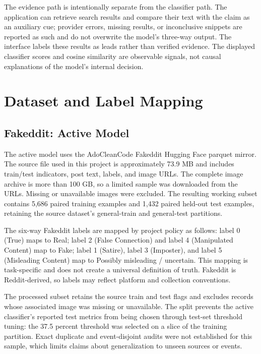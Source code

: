 \documentclass[conference]{IEEEtran}
\begin{document}
The evidence path is intentionally separate from the classifier path. The application can retrieve search results and compare their text with the claim as an auxiliary cue; provider errors, missing results, or inconclusive snippets are reported as such and do not overwrite the model's three-way output. The interface labels these results as leads rather than verified evidence. The displayed classifier scores and cosine similarity are observable signals, not causal explanations of the model's internal decision.

\section{Dataset and Label Mapping}
\subsection{Fakeddit: Active Model}
The active model uses the AdoCleanCode Fakeddit Hugging Face parquet mirror. The source file used in this project is approximately 73.9 MB and includes train/test indicators, post text, labels, and image URLs. The complete image archive is more than 100 GB, so a limited sample was downloaded from the URLs. Missing or unavailable images were excluded. The resulting working subset contains 5,686 paired training examples and 1,432 paired held-out test examples, retaining the source dataset's general-train and general-test partitions.

The six-way Fakeddit labels are mapped by project policy as follows: label 0 (True) maps to Real; label 2 (False Connection) and label 4 (Manipulated Content) map to Fake; label 1 (Satire), label 3 (Imposter), and label 5 (Misleading Content) map to Possibly misleading / uncertain. This mapping is task-specific and does not create a universal definition of truth. Fakeddit is Reddit-derived, so labels may reflect platform and collection conventions.

The processed subset retains the source train and test flags and excludes records whose associated image was missing or unavailable. The split prevents the active classifier's reported test metrics from being chosen through test-set threshold tuning: the 37.5 percent threshold was selected on a slice of the training partition. Exact duplicate and event-disjoint audits were not established for this sample, which limits claims about generalization to unseen sources or events.
\end{document}
